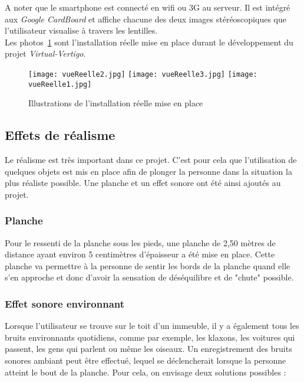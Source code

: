 A noter que le \textsf{smartphone} est connecté en wifi ou 3G au serveur. Il est intégré aux \textit{Google CardBoard} et affiche chacune des deux images stéréoscopiques que l'utilisateur visualise à travers les lentilles.\\

Les photos~\ref{reelle} sont l'installation réelle mise en place durant le développement du projet \textit{Virtual-Vertigo}.
\begin{figure}[H]
\centering
\texttt{[image: vueReelle2.jpg]}
\texttt{[image: vueReelle3.jpg]}
\texttt{[image: vueReelle1.jpg]}
\caption{\label{reelle} Illustrations de l'installation réelle mise en place}
\end{figure}


\subsection*{Effets de réalisme}  \label{realisme}
Le réalisme est très important dans ce projet. C'est pour cela que l'utilisation de quelques objets est mis en place afin de plonger la personne dans la situation la plus réaliste possible. Une planche et un effet sonore ont été ainsi ajoutés au projet.\\

\subsubsection{Planche}
Pour le ressenti de la planche sous les pieds, une planche de 2,50 mètres de distance ayant environ 5 centimètres d'épaisseur a été mise en place. Cette planche va permettre à la personne de sentir les bords de la planche quand elle s'en approche et donc d'avoir la sensation de déséquilibre et de "chute" possible. 

\subsubsection{Effet sonore environnant}
Lorsque l'utilisateur se trouve sur le toit d'un immeuble, il y a également tous les bruits environnants quotidiens, comme par exemple, les klaxons, les voitures qui passent, les gens qui parlent ou même les oiseaux. Un enregistrement des bruits sonores ambiant peut être effectué, lequel se déclencherait lorsque la personne atteint le bout de la planche. Pour cela, on envisage deux solutions possibles : \\

